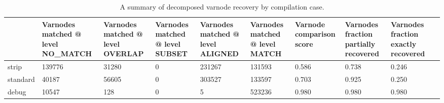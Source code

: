 \begin{table*}[tb]
\centering
\caption{A summary of decomposed varnode recovery by compilation case.}
\label{table:opts-varnodes-summary-decomposed}
\begin{tabular}{lp{1.50cm}p{1.33cm}p{1.33cm}p{1.33cm}p{1.33cm}p{1.33cm}p{1.33cm}p{1.33cm}p{1.33cm}}
\toprule
{} & {Varnodes matched @ level NO\_MATCH} & {Varnodes matched @ level OVERLAP} & {Varnodes matched @ level SUBSET} & {Varnodes matched @ level ALIGNED} & {Varnodes matched @ level MATCH} & {Varnode comparison score} & {Varnodes fraction partially recovered} & {Varnodes fraction exactly recovered} \\
\midrule
strip    &                                             139776 &                                            31280 &                                               0 &                                           231267 &                                         131593 &                                    0.586 &                                              0.738 &                                              0.246 \\
standard &                                              40187 &                                            56605 &                                               0 &                                           303527 &                                         133597 &                                    0.703 &                                              0.925 &                                              0.250 \\
debug    &                                              10547 &                                              128 &                                               0 &                                                5 &                                         523236 &                                    0.980 &                                              0.980 &                                              0.980 \\
\bottomrule
\end{tabular}
\end{table*}
